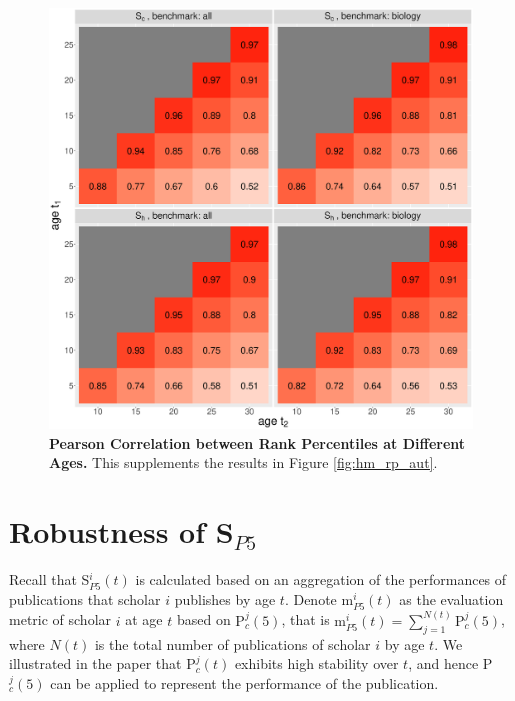 \begin{refsection}
\begin{figure}[ht!]
    \centering
    \includegraphics[width=\textwidth]{figures/pred_power/suppl_heatmap_cor_current.eps}
    \caption{{\bf Pearson Correlation between Rank Percentiles at Different Ages.} 
    This supplements the results in Figure \ref{fig:hm_rp_aut}.}
    \label{fig:hm_autrp_current}
\end{figure}



\section{Robustness of \texorpdfstring{S$_{P5}$}{Lg}}
\label{sec:suppl_robustness_P5}

Recall that S$_{P5}^{i}(t)$ is calculated based on an aggregation of the performances of publications that scholar $i$ publishes by age $t$. Denote $\text{m}_{P5}^{i}(t)$ as the evaluation metric of scholar $i$ at age $t$ based on $\text{P}_{c}^{j}(5)$, that is $\text{m}_{P5}^{i}(t)= \sum_{j=1}^{N(t)} \text{P}_{c}^{j}(5)$, where $N(t)$ is the total number of publications of scholar $i$ by age $t$. We illustrated in the paper that P$_c^j(t)$ exhibits high stability over $t$, and hence P$_{c}^{j}(5)$ can be applied to represent the performance of the publication. 


\end{refsection}

